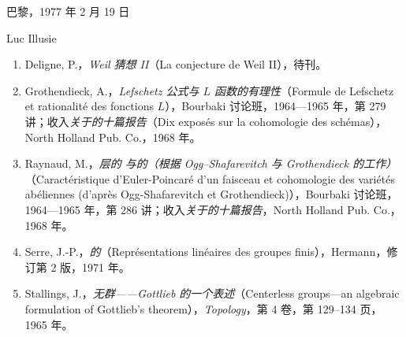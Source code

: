 \begin{flushright}
巴黎，1977 年 2 月 19 日\par
Luc Illusie
\end{flushright}

\begin{enumerate}
\item[{[1]}] Deligne, P.，\emph{Weil 猜想 II}（La conjecture de Weil II），待刊。
\item[{[2]}] Grothendieck, A.，\emph{Lefschetz 公式与 $L$ 函数的有理性}（Formule de Lefschetz et rationalité des fonctions $L$），Bourbaki 讨论班，1964—1965 年，第 279 讲；收入\emph{关于的十篇报告}（Dix exposés sur la cohomologie des schémas），North Holland Pub. Co.，1968 年。
\item[{[3]}] Raynaud, M.，\emph{层的 与的（根据 Ogg--Shafarevitch 与 Grothendieck 的工作）}（Caractéristique d'Euler-Poincaré d'un faisceau et cohomologie des variétés abéliennes (d'après Ogg-Shafarevitch et Grothendieck)），Bourbaki 讨论班，1964—1965 年，第 286 讲；收入\emph{关于的十篇报告}，North Holland Pub. Co.，1968 年。
\item[{[4]}] Serre, J.-P.，\emph{的}（Représentations linéaires des groupes finis），Hermann，修订第 2 版，1971 年。
\item[{[5]}] Stallings, J.，\emph{无群——Gottlieb 的一个表述}（Centerless groups---an algebraic formulation of Gottlieb's theorem），\emph{Topology}，第 4 卷，第 129--134 页，1965 年。
\end{enumerate}

